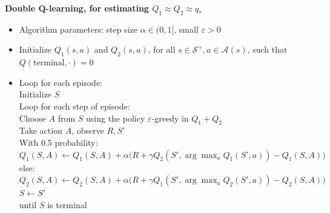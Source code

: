 \textbf{Double Q-learning, for estimating $Q_1 \approx Q_2 \approx q_*$}
\begin{itemize}[leftmargin=*]
	\item[] Algorithm parameters: step size $\alpha \in (0, 1]$, small $\varepsilon > 0$
	\item[] Initialize $Q_1(s, a)$ and $Q_2(s, a)$, for all $s \in \mathcal{S}^+, a \in \mathcal{A}(s)$, such that $Q(\text{terminal}, \cdot) = 0$

	\item[] Loop for each episode:\\
	      Initialize $S$\\
	      Loop for each step of episode:\\
	      \hspace*{1em} Choose $A$ from $S$ using the policy $\varepsilon$-greedy in $Q_1 + Q_2$\\
	      \hspace*{1em} Take action $A$, observe $R, S'$\\
	      \hspace*{1em} With 0.5 probability:\\
	      \hspace*{2em} $Q_1(S, A) \leftarrow Q_1(S, A) + \alpha \Big(R + \gamma Q_2(S', \arg\max_a Q_1(S', a)) - Q_1(S, A)\Big)$\\
	      \hspace*{1em} else:\\
	      \hspace*{2em} $Q_2(S, A) \leftarrow Q_2(S, A) + \alpha \Big(R + \gamma Q_1(S', \arg\max_a Q_2(S', a)) - Q_2(S, A)\Big)$\\
	      \hspace*{1em} $S \leftarrow S'$\\
	      until $S$ is terminal
\end{itemize}
